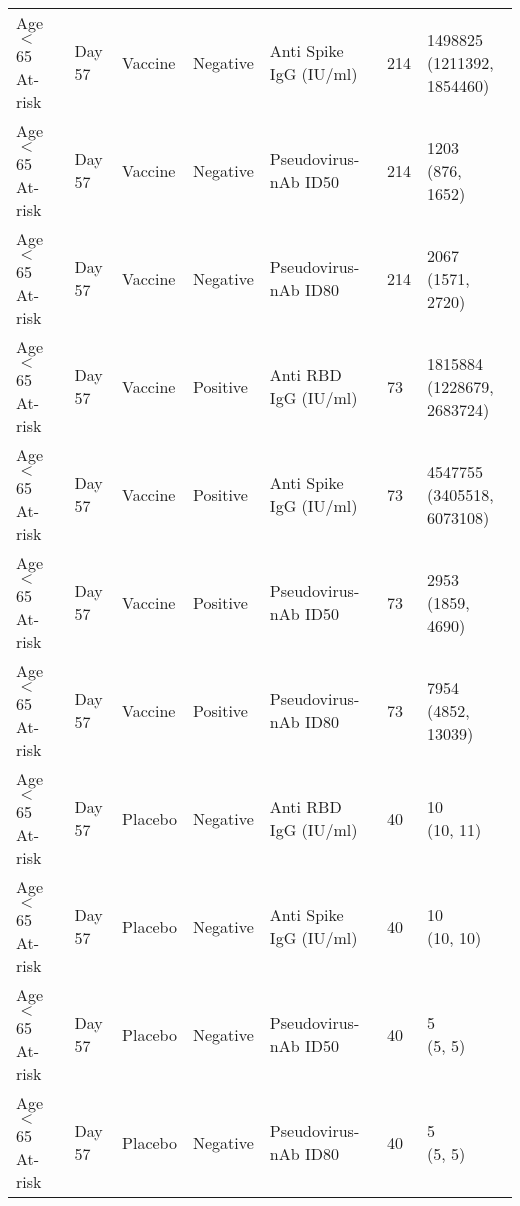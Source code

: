 \documentclass[]{book}
\theoremstyle{definition}
\theoremstyle{definition}
\theoremstyle{definition}
\newcommand{\1}{\mathbbm{1}}
\begin{document}
\begin{landscape}
\begin{ThreePartTable}
\begin{longtable}[t]{>{\raggedright\arraybackslash}p{7cm}llllll}
\hspace{1em}Age $<$ 65 At-risk & Day 57 & Vaccine & Negative & Anti Spike IgG (IU/ml) & 214 & \makecell[l]{1498825\\(1211392, 1854460)}\\
\hspace{1em}Age $<$ 65 At-risk & Day 57 & Vaccine & Negative & Pseudovirus-nAb ID50 & 214 & \makecell[l]{1203\\(876, 1652)}\\
\hspace{1em}Age $<$ 65 At-risk & Day 57 & Vaccine & Negative & Pseudovirus-nAb ID80 & 214 & \makecell[l]{2067\\(1571, 2720)}\\
\hspace{1em}Age $<$ 65 At-risk & Day 57 & Vaccine & Positive & Anti RBD IgG (IU/ml) & 73 & \makecell[l]{1815884\\(1228679, 2683724)}\\
\hspace{1em}Age $<$ 65 At-risk & Day 57 & Vaccine & Positive & Anti Spike IgG (IU/ml) & 73 & \makecell[l]{4547755\\(3405518, 6073108)}\\
\hspace{1em}Age $<$ 65 At-risk & Day 57 & Vaccine & Positive & Pseudovirus-nAb ID50 & 73 & \makecell[l]{2953\\(1859, 4690)}\\
\hspace{1em}Age $<$ 65 At-risk & Day 57 & Vaccine & Positive & Pseudovirus-nAb ID80 & 73 & \makecell[l]{7954\\(4852, 13039)}\\
\hspace{1em}Age $<$ 65 At-risk & Day 57 & Placebo & Negative & Anti RBD IgG (IU/ml) & 40 & \makecell[l]{10\\(10, 11)}\\
\hspace{1em}Age $<$ 65 At-risk & Day 57 & Placebo & Negative & Anti Spike IgG (IU/ml) & 40 & \makecell[l]{10\\(10, 10)}\\
\hspace{1em}Age $<$ 65 At-risk & Day 57 & Placebo & Negative & Pseudovirus-nAb ID50 & 40 & \makecell[l]{5\\(5, 5)}\\
\hspace{1em}Age $<$ 65 At-risk & Day 57 & Placebo & Negative & Pseudovirus-nAb ID80 & 40 & \makecell[l]{5\\(5, 5)}\\

\end{longtable}
\end{ThreePartTable}
\end{landscape}
\end{document}
